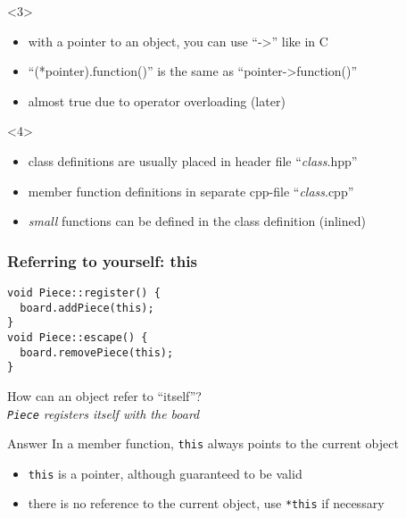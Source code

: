 \documentclass{slides}
\begin{document}
\begin{frame}[fragile]
  \begin{onlyenv}<3>
    \begin{itemize}
    \item with a pointer to an object, you can use ``->'' like in C
    \item ``(*pointer).function()'' is the same as ``pointer->function()''
    \item almost true due to operator overloading (later)
    \end{itemize}
  \end{onlyenv}

  \begin{onlyenv}<4>
    \begin{itemize}
    \item class definitions are usually placed in header file ``\textit{class}.hpp''
    \item member function definitions in separate cpp-file ``\textit{class}.cpp''
    \item \emph{small} functions can be defined in the class definition (\alert{inlined})
    \end{itemize}
  \end{onlyenv}

\end{frame}

\begin{frame}[fragile]
  \frametitle{Referring to yourself: this}

\begin{lstlisting}[emph={this}]
void Piece::register() {
  board.addPiece(this);
}
void Piece::escape() {
  board.removePiece(this);
}
\end{lstlisting}

  \begin{block}{}
    How can an object refer to ``itself''?\\
    \emph{\lstinline!Piece! registers itself with the board}
  \end{block}

  \begin{block}{Answer}
    In a member function, \lstinline!this! always points to the
    current object
  \end{block}

  \begin{itemize}
  \item \lstinline!this! is a pointer, although guaranteed to be valid
  \item there is no reference to the current object, use \lstinline!*this!
    if necessary
  \end{itemize}
\end{frame}
\end{document}
